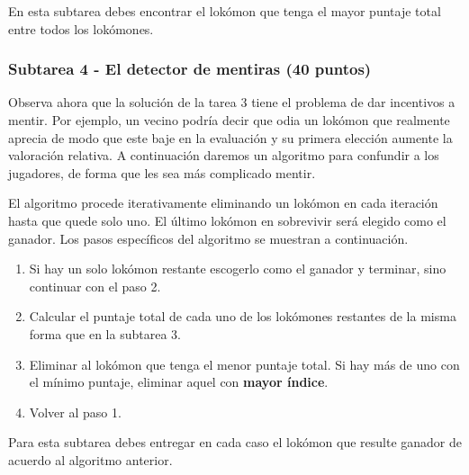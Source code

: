 \documentclass{oci}
\begin{document}

En esta subtarea debes encontrar el lokómon que tenga el mayor puntaje total
entre todos los lokómones.

\begin{sampleDescription}
\end{sampleDescription}

\subsubsection*{Subtarea 4 - El detector de mentiras (40 puntos)}
Observa ahora que la solución de la tarea 3 tiene el problema de dar incentivos
a mentir.
Por ejemplo, un vecino podría decir que odia un lokómon que realmente aprecia de
modo que este baje en la evaluación y su primera elección aumente la
valoración relativa. 
A continuación daremos un algoritmo para confundir a los jugadores, de forma que
les sea más complicado mentir.

El algoritmo procede iterativamente eliminando un lokómon en cada iteración
hasta que quede solo uno.
El último lokómon en sobrevivir será elegido como el ganador.
Los pasos específicos del algoritmo se muestran a continuación.

\begin{enumerate}
	\item Si hay un solo lokómon restante escogerlo como el ganador y terminar,
    sino continuar con el paso 2.
	\item Calcular el puntaje total de cada uno de los lokómones restantes de
    la misma forma que en la subtarea 3.
	\item Eliminar al lokómon que tenga el menor puntaje total.
    Si hay más de uno con el mínimo puntaje, eliminar aquel con \textbf{mayor
      índice}.
	\item Volver al paso 1.
\end{enumerate}

Para esta subtarea debes entregar en cada caso el lokómon que resulte ganador de
acuerdo al algoritmo anterior.

\begin{sampleDescription}
\end{sampleDescription}
\end{document}
